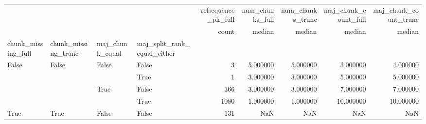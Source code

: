 \begin{tabular}{llllrrrrr}
\toprule
 &  &  &  & refsequence\_pk\_full & num\_chunks\_full & num\_chunks\_trunc & maj\_chunk\_count\_full & maj\_chunk\_count\_trunc \\
 &  &  &  & count & median & median & median & median \\
chunk_missing_full & chunk_missing_trunc & maj_chunk_equal & maj_split_rank_equal_either &  &  &  &  &  \\
\midrule
\multirow[t]{4}{*}{False} & \multirow[t]{4}{*}{False} & \multirow[t]{2}{*}{False} & False & 3 & 5.000000 & 5.000000 & 3.000000 & 4.000000 \\
 &  &  & True & 1 & 3.000000 & 3.000000 & 5.000000 & 5.000000 \\
\cline{3-9}
 &  & \multirow[t]{2}{*}{True} & False & 366 & 3.000000 & 3.000000 & 7.000000 & 7.000000 \\
 &  &  & True & 1080 & 1.000000 & 1.000000 & 10.000000 & 10.000000 \\
\cline{1-9} \cline{2-9} \cline{3-9}
True & True & False & False & 131 & NaN & NaN & NaN & NaN \\
\cline{1-9} \cline{2-9} \cline{3-9}
\bottomrule
\end{tabular}
